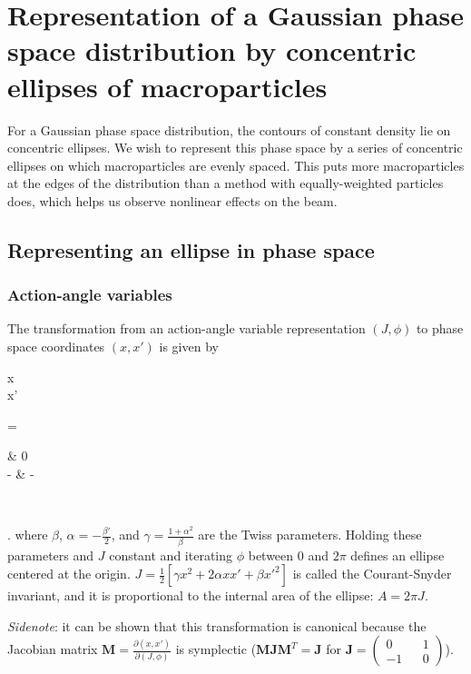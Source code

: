 \chapter{Representation of a Gaussian phase space distribution by concentric ellipses of macroparticles}

For a Gaussian phase space distribution, the contours of constant density lie on concentric ellipses.  We wish to represent this phase space by a series of concentric ellipses on which macroparticles are evenly spaced.  This puts more macroparticles at the edges of the distribution than a method with equally-weighted particles does, which helps us observe nonlinear effects on the beam.

\section{Representing an ellipse in phase space}

\subsection{Action-angle variables}
The transformation from an action-angle variable representation $(J,\phi)$ to phase space coordinates $(x, x')$ is given by
\Begineq
	\begin{pmatrix} x \\ x' \end{pmatrix}
	=  
	\begin{pmatrix} \sqrt{\beta} & 0 \\ -\frac{\alpha}{\sqrt{\beta}} & - \end{pmatrix}
	\begin{pmatrix} \cos\phi \\ \sin\phi \end{pmatrix}.
\Endeq
where $\beta$, $\alpha = -\frac{\beta'}{2}$, and $\gamma = \frac{1+\alpha^2}{\beta}$ are the Twiss parameters.  Holding these parameters and $J$ constant and iterating $\phi$ between $0$ and $2\pi$ defines an ellipse centered at the origin.  $J = \frac{1}{2}[\gamma x^2 + 2 \alpha x x' + \beta x'^2]$ is called the Courant-Snyder invariant, and it is proportional to the internal area of the ellipse: $A = 2\pi J$. 

\textit{Sidenote}: it can be shown that this transformation is canonical because the Jacobian matrix $\mathbf{M} = \frac{\partial(x,x')}{\partial(J,\phi)}$ is symplectic ($\mathbf{M}\mathbf{J}\mathbf{M}^T = \mathbf{J}$ for $\mathbf{J} = (\begin{smallmatrix} 0 && 1 \\ -1 && 0 \end{smallmatrix})$).


